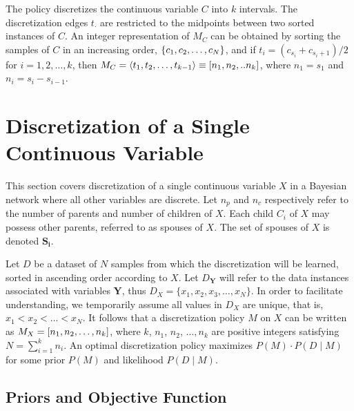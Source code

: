 \noindent
The policy discretizes the continuous variable $C$ into $k$ intervals.
The discretization edges $t_\cdot$ are restricted to the midpoints between two sorted instances of $C$.
An integer representation of $M_C$ can be obtained by sorting the samples of $C$ in an increasing order, $\curly{c_1,c_2,\ldots,c_N}$, and if $t_i = (c_{s_{i}} + c_{s_{i}+1})/2$ for $i=1,2,\ldots,k$, then $M_C = \anglebrackets{t_1,t_2, \ldots, t_{k-1}} \equiv \brock{n_1,n_2,..n_k}$, where $n_1 = s_1$ and $n_i = s_{i} - s_{i-1}$.


\section{Discretization of a Single Continuous Variable}
\label{sec:single_var}

This section covers discretization of a single continuous variable $X$ in a Bayesian network where all other variables are discrete.
Let $n_p$ and $n_c$ respectively refer to the number of parents and number of children of $X$.
Each child $C_i$ of $X$ may possess other parents, referred to as spouses of $X$.
The set of spouses of $X$ is denoted $\boldsymbol{S_i}$.

Let $D$ be a dataset of $N$ samples from which the discretization will be learned, sorted in ascending order according to $X$.
Let $D_{\boldsymbol{Y}}$ will refer to the data instances associated with variables $\boldsymbol{Y}$, thus $D_X = \{ x_1,x_2,x_3,\ldots,x_N \}$.
In order to facilitate understanding, we temporarily assume all values in $D_X$ are unique, that is, $x_1 < x_2 < \ldots < x_N$.
It follows that a discretization policy $M$ on $X$ can be written as $M_X = \brock{n_1,n_2,\ldots,n_k}$, where $k$, $n_1$, $n_2$, $\ldots,n_k$ are positive integers satisfying $N = \sum_{i=1}^k n_i$.
An optimal discretization policy maximizes $P(M)\cdot P(D\mid M)$ for some prior $P(M)$ and likelihood $P(D\mid M)$.



\subsection{Priors and Objective Function}

